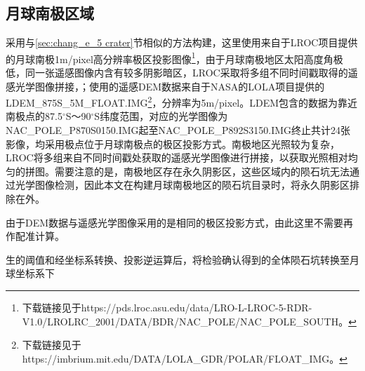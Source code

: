 \subsection{月球南极区域}
采用与\ref{sec:chang_e_5 crater}节相似的方法构建，这里使用来自于LROC项目提供的月球南极1m/pixel高分辨率极区投影图像\footnote{ 下载链接见于https://pds.lroc.asu.edu/data/LRO-L-LROC-5-RDR-V1.0/LROLRC\_2001/DATA/BDR/NAC\_POLE/NAC\_POLE\_SOUTH。}，由于月球南极地区太阳高度角极低，同一张遥感图像内含有较多阴影暗区，LROC采取将多组不同时间戳取得的遥感光学图像拼接，；使用的遥感DEM数据来自于NASA的LOLA\cite{barkerImprovedLOLAElevation2021}项目提供的LDEM\_875S\_5M\_FLOAT.IMG\footnote{下载链接见于https://imbrium.mit.edu/DATA/LOLA\_GDR/POLAR/FLOAT\_IMG。}，分辨率为5m/pixel。LDEM包含的数据为靠近南极点的87.5$^\circ$S～90$^\circ$S纬度范围，对应的光学图像为NAC\_POLE\_P870S0150.IMG起至NAC\_POLE\_P892S3150.IMG终止共计24张影像，均采用极点位于月球南极点的极区投影方式。南极地区光照较为复杂，LROC将多组来自不同时间戳处获取的遥感光学图像进行拼接，以获取光照相对均匀的拼图。需要注意的是，南极地区存在永久阴影区，这些区域内的陨石坑无法通过光学图像检测，因此本文在构建月球南极地区的陨石坑目录时，将永久阴影区排除在外。

\par 由于DEM数据与遥感光学图像采用的是相同的极区投影方式，由此这里不需要再作配准计算。\par
生的阈值和经坐标系转换、投影逆运算后，将检验确认得到的全体陨石坑转换至月球坐标系下